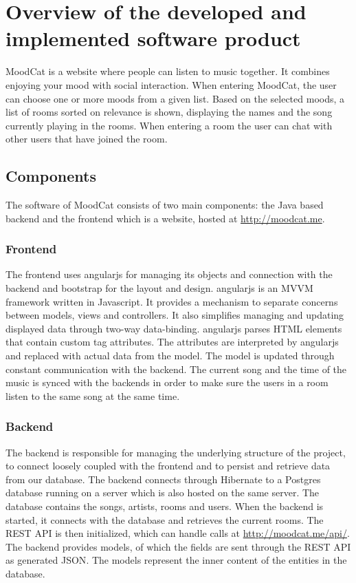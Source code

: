 \chapter{Overview of the developed and implemented software product}

MoodCat is a website where people can listen to music together.
It combines enjoying your mood with social interaction.
When entering MoodCat, the user can choose one or more moods from a given list.
Based on the selected moods, a list of rooms sorted on relevance is shown, displaying the names and the song currently playing in the rooms. 
When entering a room the user can chat with other users that have joined the room.

\section{Components}
The software of MoodCat consists of two main components: the Java based backend and the frontend which is a website,
hosted at \url{http://moodcat.me}.

\subsection{Frontend}
The frontend uses \gls{angularjs} for managing its objects and connection with the backend and bootstrap for the layout and design.
\gls{angularjs} is an \gls{MVVM} framework written in Javascript.
It provides a mechanism to separate concerns between models, views and controllers.
It also simplifies managing and updating displayed data through two-way \gls{data-binding}.
\gls{angularjs} parses \gls{HTML} elements that contain custom tag attributes.
The attributes are interpreted by \gls{angularjs} and replaced with actual data from the model.
The model is updated through constant communication with the backend.
The current song and the time of the music is synced with the backends in order to make sure the users in a room listen to the same song at the same time.

\subsection{Backend}
The backend is responsible for managing the underlying structure of the project, to connect loosely coupled with the frontend and to persist and retrieve data from our database.
The backend connects through \gls{Hibernate} to a \gls{Postgres} database running on a server which is also hosted on the same server.
The database contains the songs, artists, rooms and users.
When the backend is started, it connects with the database and retrieves the current rooms.
The \gls{REST} API is then initialized, which can handle calls at \url{http://moodcat.me/api/}.
The backend provides models, of which the fields are sent through the \gls{REST} API as generated \gls{JSON}.
The models represent the inner content of the entities in the database.

